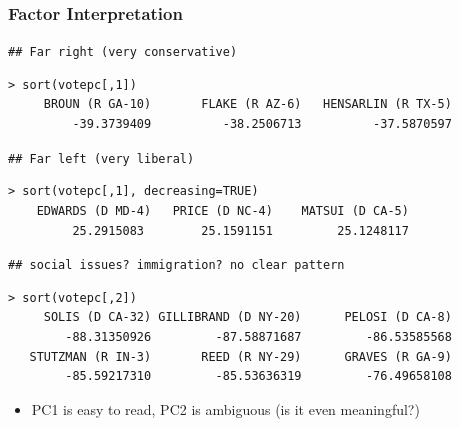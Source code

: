 \documentclass[
  shownotes,
  xcolor={svgnames},
  hyperref={colorlinks,citecolor=DarkBlue,linkcolor=DarkRed,urlcolor=DarkBlue}
  , aspectratio=169]{beamer}
\newcommand{\theme}{\color{andesred}}
\newcommand{\nv}{\color{Navy}}
\begin{document}
\begin{frame}[fragile]
\frametitle{Factor Interpretation}




{\scriptsize \nv

{\theme \tt \#\# Far right (very conservative) \vspace{-.25cm}}
\begin{verbatim}
> sort(votepc[,1])
     BROUN (R GA-10)       FLAKE (R AZ-6)   HENSARLIN (R TX-5) 
         -39.3739409          -38.2506713          -37.5870597 
\end{verbatim}

{\theme \tt \#\# Far left (very liberal) \vspace{-.25cm}}
\begin{verbatim}
> sort(votepc[,1], decreasing=TRUE)
    EDWARDS (D MD-4)   PRICE (D NC-4)    MATSUI (D CA-5)      
         25.2915083        25.1591151         25.1248117     
\end{verbatim}       
  

{\theme \tt \#\# social issues? immigration? no clear pattern\vspace{-.25cm}}
\begin{verbatim}
> sort(votepc[,2])
     SOLIS (D CA-32) GILLIBRAND (D NY-20)      PELOSI (D CA-8) 
        -88.31350926         -87.58871687         -86.53585568 
   STUTZMAN (R IN-3)       REED (R NY-29)      GRAVES (R GA-9) 
        -85.59217310         -85.53636319         -76.49658108 
\end{verbatim}
}

\begin{itemize}
  \item PC1 is easy to read, PC2 is ambiguous (is it even meaningful?)
\end{itemize}


\end{frame}
\end{document}
